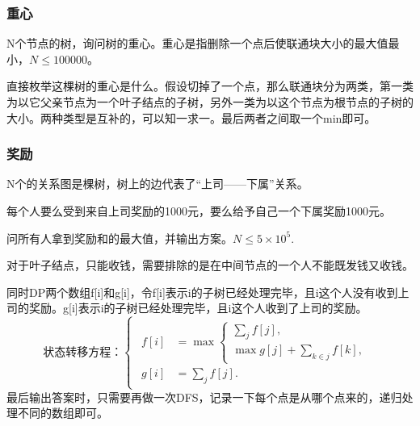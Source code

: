 \documentclass{article}
\begin{document}
\subsubsection{重心}
N个节点的树，询问树的重心。重心是指删除一个点后使联通块大小的最大值最小，$N\le 100000$。

直接枚举这棵树的重心是什么。假设切掉了一个点，那么联通块分为两类，第一类为以它父亲节点为一个叶子结点的子树，另外一类为以这个节点为根节点的子树的大小。两种类型是互补的，可以知一求一。最后两者之间取一个min即可。
\subsubsection{奖励}
N个的关系图是棵树，树上的边代表了“上司——下属”关系。

每个人要么受到来自上司奖励的1000元，要么给予自己一个下属奖励1000元。

问所有人拿到奖励和的最大值，并输出方案。$N\le 5\times 10^5$.

对于叶子结点，只能收钱，需要排除的是在中间节点的一个人不能既发钱又收钱。

同时DP两个数组f[i]和g[i]，令f[i]表示i的子树已经处理完毕，且i这个人没有收到上司的奖励。g[i]表示i的子树已经处理完毕，且i这个人收到了上司的奖励。
\begin{equation*}
    状态转移方程：
    \begin{cases}
        \begin{aligned}
            f[i]&=\max
            \begin{cases}
                \sum_jf[j],\\
                \max g[j]+\sum_{k\in j}f[k],
            \end{cases}
            \\
            g[i]&=\sum_jf[j].
        \end{aligned}
    \end{cases}
\end{equation*}
最后输出答案时，只需要再做一次DFS，记录一下每个点是从哪个点来的，递归处理不同的数组即可。
\end{document}
